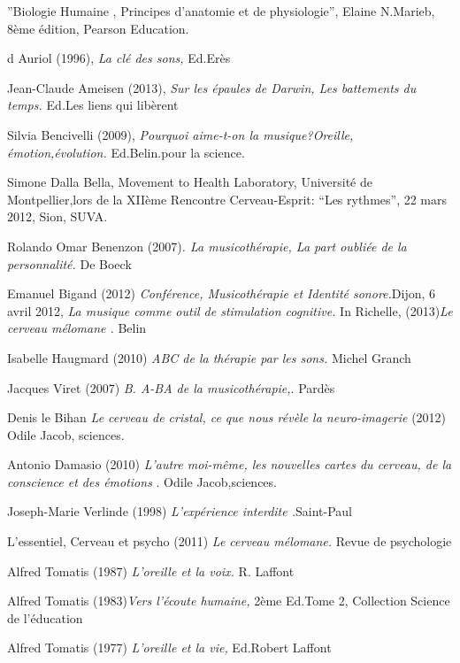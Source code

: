 \begin{thebibliography}{10}
''Biologie Humaine , Principes d'anatomie et de physiologie'',
Elaine N.Marieb, 8ème édition, Pearson Education.

d Auriol (1996), \emph{La clé des sons, }Ed.Erès

Jean-Claude Ameisen (2013), \emph{Sur les épaules
de Darwin, Les battements du temps. }Ed\emph{.}Les liens qui libèrent

Silvia Bencivelli (2009),\emph{ Pourquoi aime-t-on
la musique?Oreille, émotion,évolution. }Ed.Belin.pour la science.

Simone Dalla Bella, Movement to Health Laboratory,
Université de Montpellier,lors de la XIIème Rencontre Cerveau-Esprit:
``Les rythmes'', 22 mars 2012, Sion, SUVA.

Rolando Omar Benenzon (2007)\emph{. La musicothérapie,
La part oubliée de la personnalité. }De Boeck

Emanuel Bigand (2012) \emph{Conférence, Musicothérapie
et Identité sonore.}Dijon, 6 avril 2012,\emph{ La musique comme outil
de stimulation cognitive. }In Richelle, (2013)\emph{Le cerveau mélomane
. }Belin

Isabelle Haugmard (2010) \emph{ABC de la thérapie
par les sons. }Michel Granch

Jacques Viret (2007) \emph{B. A-BA de la musicothérapie,}.
Pardès

Denis le Bihan \emph{Le cerveau de cristal, ce que
nous révèle la neuro-imagerie} (2012) Odile Jacob, sciences.

Antonio Damasio (2010) \emph{L'autre moi-même, les
nouvelles cartes du cerveau, de la conscience et des émotions }. Odile
Jacob,sciences.

Joseph-Marie Verlinde (1998) \emph{L'expérience interdite
.}Saint-Paul

L'essentiel, Cerveau et psycho (2011) \emph{Le cerveau
mélomane. }Revue de psychologie

Alfred Tomatis (1987) \emph{L'oreille et la voix.
}R. Laffont

Alfred Tomatis\emph{ }(1983)\emph{Vers l'écoute
humaine, }2ème Ed.Tome 2, Collection Science de l'éducation

Alfred Tomatis (1977) \emph{L'oreille et la vie,}
Ed.Robert Laffont


\end{thebibliography}

